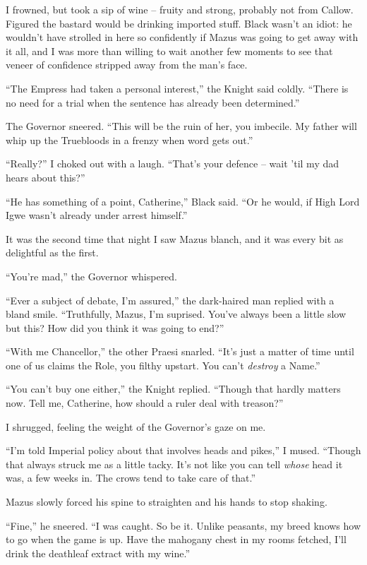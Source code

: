 \documentclass[12pt, openany]{book}
\begin{document}
I frowned, but took a sip of wine – fruity and strong, probably not from Callow. Figured the bastard would be drinking imported stuff. Black wasn’t an idiot: he wouldn’t have strolled in here so confidently if Mazus was going to get away with it all, and I was more than willing to wait another few moments to see that veneer of confidence stripped away from the man’s face.

“The Empress had taken a personal interest,” the Knight said coldly. “There is no need for a trial when the sentence has already been determined.”

The Governor sneered. “This will be the ruin of her, you imbecile. My father will whip up the Truebloods in a frenzy when word gets out.”

“Really?” I choked out with a laugh. “That’s your defence – wait ’til my dad hears about this?”

“He has something of a point, Catherine,” Black said. “Or he would, if High Lord Igwe wasn’t already under arrest himself.”

It was the second time that night I saw Mazus blanch, and it was every bit as delightful as the first.

“You’re mad,” the Governor whispered.

“Ever a subject of debate, I’m assured,” the dark-haired man replied with a bland smile. “Truthfully, Mazus, I’m suprised. You’ve always been a little slow but this? How did you think it was going to end?”

“With me Chancellor,” the other Praesi snarled. “It’s just a matter of time until one of us claims the Role, you filthy upstart. You can’t \textit{destroy} a Name.”

“You can’t buy one either,” the Knight replied. “Though that hardly matters now. Tell me, Catherine, how should a ruler deal with treason?”

I shrugged, feeling the weight of the Governor’s gaze on me.

“I’m told Imperial policy about that involves heads and pikes,” I mused. “Though that always struck me as a little tacky. It’s not like you can tell \textit{whose} head it was, a few weeks in. The crows tend to take care of that.”

Mazus slowly forced his spine to straighten and his hands to stop shaking.

“Fine,” he sneered. “I was caught. So be it. Unlike peasants, my breed knows how to go when the game is up. Have the mahogany chest in my rooms fetched, I’ll drink the deathleaf extract with my wine.”
\end{document}
